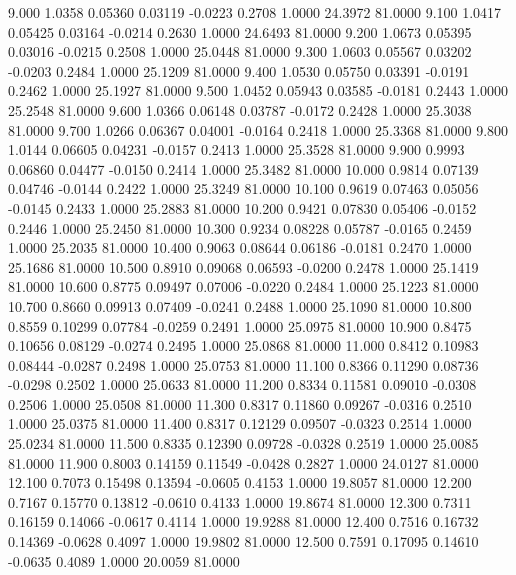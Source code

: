    9.000   1.0358   0.05360   0.03119  -0.0223   0.2708   1.0000  24.3972  81.0000
   9.100   1.0417   0.05425   0.03164  -0.0214   0.2630   1.0000  24.6493  81.0000
   9.200   1.0673   0.05395   0.03016  -0.0215   0.2508   1.0000  25.0448  81.0000
   9.300   1.0603   0.05567   0.03202  -0.0203   0.2484   1.0000  25.1209  81.0000
   9.400   1.0530   0.05750   0.03391  -0.0191   0.2462   1.0000  25.1927  81.0000
   9.500   1.0452   0.05943   0.03585  -0.0181   0.2443   1.0000  25.2548  81.0000
   9.600   1.0366   0.06148   0.03787  -0.0172   0.2428   1.0000  25.3038  81.0000
   9.700   1.0266   0.06367   0.04001  -0.0164   0.2418   1.0000  25.3368  81.0000
   9.800   1.0144   0.06605   0.04231  -0.0157   0.2413   1.0000  25.3528  81.0000
   9.900   0.9993   0.06860   0.04477  -0.0150   0.2414   1.0000  25.3482  81.0000
  10.000   0.9814   0.07139   0.04746  -0.0144   0.2422   1.0000  25.3249  81.0000
  10.100   0.9619   0.07463   0.05056  -0.0145   0.2433   1.0000  25.2883  81.0000
  10.200   0.9421   0.07830   0.05406  -0.0152   0.2446   1.0000  25.2450  81.0000
  10.300   0.9234   0.08228   0.05787  -0.0165   0.2459   1.0000  25.2035  81.0000
  10.400   0.9063   0.08644   0.06186  -0.0181   0.2470   1.0000  25.1686  81.0000
  10.500   0.8910   0.09068   0.06593  -0.0200   0.2478   1.0000  25.1419  81.0000
  10.600   0.8775   0.09497   0.07006  -0.0220   0.2484   1.0000  25.1223  81.0000
  10.700   0.8660   0.09913   0.07409  -0.0241   0.2488   1.0000  25.1090  81.0000
  10.800   0.8559   0.10299   0.07784  -0.0259   0.2491   1.0000  25.0975  81.0000
  10.900   0.8475   0.10656   0.08129  -0.0274   0.2495   1.0000  25.0868  81.0000
  11.000   0.8412   0.10983   0.08444  -0.0287   0.2498   1.0000  25.0753  81.0000
  11.100   0.8366   0.11290   0.08736  -0.0298   0.2502   1.0000  25.0633  81.0000
  11.200   0.8334   0.11581   0.09010  -0.0308   0.2506   1.0000  25.0508  81.0000
  11.300   0.8317   0.11860   0.09267  -0.0316   0.2510   1.0000  25.0375  81.0000
  11.400   0.8317   0.12129   0.09507  -0.0323   0.2514   1.0000  25.0234  81.0000
  11.500   0.8335   0.12390   0.09728  -0.0328   0.2519   1.0000  25.0085  81.0000
  11.900   0.8003   0.14159   0.11549  -0.0428   0.2827   1.0000  24.0127  81.0000
  12.100   0.7073   0.15498   0.13594  -0.0605   0.4153   1.0000  19.8057  81.0000
  12.200   0.7167   0.15770   0.13812  -0.0610   0.4133   1.0000  19.8674  81.0000
  12.300   0.7311   0.16159   0.14066  -0.0617   0.4114   1.0000  19.9288  81.0000
  12.400   0.7516   0.16732   0.14369  -0.0628   0.4097   1.0000  19.9802  81.0000
  12.500   0.7591   0.17095   0.14610  -0.0635   0.4089   1.0000  20.0059  81.0000
